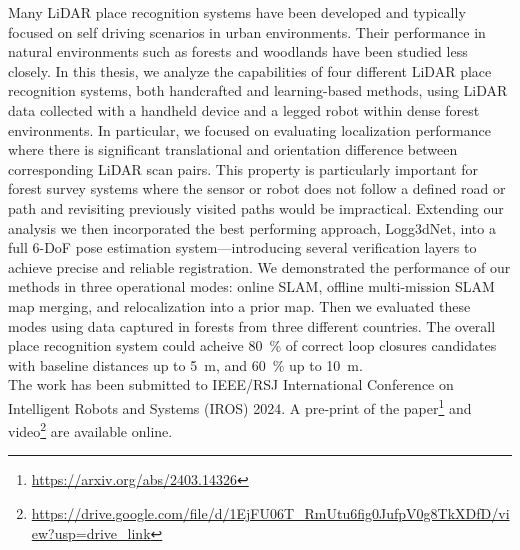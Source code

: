 Many LiDAR place recognition systems have been developed and typically focused on self driving scenarios in urban environments. Their performance in natural environments such as forests and woodlands have been studied less closely. In this thesis, we analyze the capabilities of four different LiDAR place recognition systems, both handcrafted and learning-based methods, using LiDAR data collected with a handheld device and a legged robot within dense forest environments. 
In particular, we focused on evaluating localization performance where there is significant translational and orientation difference between corresponding LiDAR scan pairs. This property is particularly important for forest survey systems where the sensor or robot does not follow a defined road or path and revisiting previously visited paths would be impractical.  
Extending our analysis we then incorporated the best performing approach, Logg3dNet, into a full 6-DoF pose estimation system---introducing several verification layers to achieve precise and reliable registration.  
We demonstrated the performance of our methods in three operational modes: online SLAM, offline multi-mission SLAM map merging, and relocalization into a prior map. 
Then we evaluated these modes using data captured in forests from three different countries. The overall place recognition system could acheive \SI{80}{\percent} of correct loop closures candidates with baseline distances up to \SI{5}{\meter}, and \SI{60}{\percent} up to \SI{10}{\meter}.  \\

The work has been submitted to IEEE/RSJ International Conference on Intelligent Robots and Systems (IROS) 2024. A pre-print of the paper\footnote{\url{https://arxiv.org/abs/2403.14326}} and video\footnote{ \url{https://drive.google.com/file/d/1EjFU06T_RmUtu6fig0JufpV0g8TkXDfD/view?usp=drive_link}} are available online. 